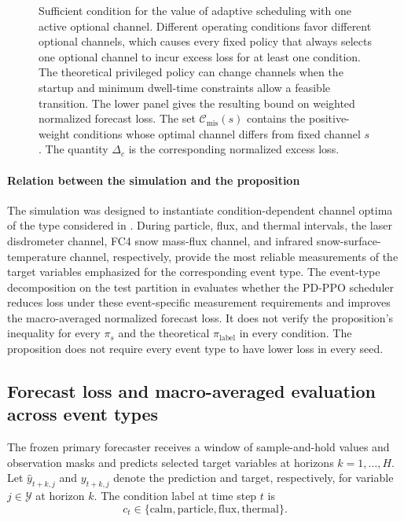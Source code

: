 \begin{figure}[H]
  \centering
  \resizebox{\linewidth}{!}{}
  \caption{Sufficient condition for the value of adaptive scheduling with one
  active optional channel. Different operating conditions favor different
  optional channels, which causes every fixed policy that always selects one
  optional channel to incur excess
  loss for at least one condition. The theoretical privileged policy can change channels
  when the startup and minimum dwell-time constraints allow a feasible
  transition. The lower panel gives the resulting bound on weighted normalized
  forecast loss. The set $\mathcal{C}_{\mathrm{mis}}(s)$ contains the
  positive-weight conditions whose optimal channel differs from fixed channel
  $s$. The quantity $\Delta_c$ is the corresponding normalized excess loss.}
  \label{fig:specialist_bottleneck}
\end{figure}

\paragraph{Relation between the simulation and the proposition}
The simulation was designed to instantiate condition-dependent channel optima
of the type considered in . During particle,
flux, and thermal intervals,
the laser disdrometer channel, FC4 snow mass-flux channel, and infrared
snow-surface-temperature channel, respectively, provide the most reliable measurements of the
target variables emphasized for the corresponding event type. The event-type
decomposition on the test partition in
 evaluates whether the PD-PPO scheduler
reduces loss under these event-specific measurement requirements and improves
the macro-averaged normalized forecast loss. It does not verify the proposition's
inequality for every $\pi_s$ and the theoretical $\pi_{\mathrm{label}}$ in every
condition. The proposition does not require every event type to have lower loss
in every seed.

\subsection{Forecast loss and macro-averaged evaluation across event types}

The frozen primary forecaster receives a window of sample-and-hold values and
observation masks and predicts selected target variables at horizons
$k=1,\ldots,H$. Let $\hat{y}_{t+k,j}$ and $y_{t+k,j}$ denote the prediction
and target, respectively, for variable $j\in\mathcal{Y}$ at horizon $k$. The
condition label at time step $t$ is
\begin{equation}
  c_t\in\{\text{calm},\text{particle},\text{flux},\text{thermal}\}.
\end{equation}

